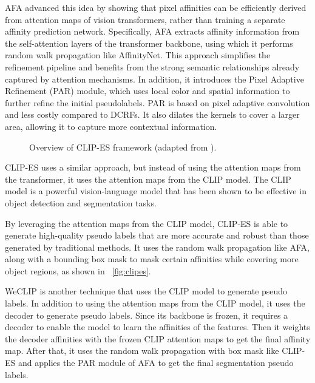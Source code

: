 AFA \cite{wsss_afa_affinity_from_attention} advanced this idea by showing that pixel affinities can be efficiently derived from attention maps of vision transformers, rather than training a separate affinity prediction network. Specifically, AFA extracts affinity information from the self-attention layers of the transformer backbone, using which it performs random walk propagation like AffinityNet. This approach simplifies the refinement pipeline and benefits from the strong semantic relationships already captured by attention mechanisms. In addition, it introduces the Pixel Adaptive Refinement (PAR) module, which uses local color and spatial information to further refine the initial pseudolabels. PAR is based on pixel adaptive convolution and less costly compared to DCRFs. It also dilates the kernels to cover a larger area, allowing it to capture more contextual information.

\begin{figure}[htbp]
    \centering
    \caption{Overview of CLIP-ES framework (adapted from \cite{wsss_clip_es}).}
    \label{fig:clipes}
\end{figure}

CLIP-ES \cite{wsss_clip_es} uses a similar approach, but instead of using the attention maps from the transformer, it uses the attention maps from the CLIP model. The CLIP model is a powerful vision-language model that has been shown to be effective in object detection and segmentation tasks. 

By leveraging the attention maps from the CLIP model, CLIP-ES is able to generate high-quality pseudo labels that are more accurate and robust than those generated by traditional methods. It uses the random walk propagation like AFA, along with a bounding box mask to mask certain affinities while covering more object regions, as shown in ~\autoref{fig:clipes}.

WeCLIP\cite{wsss_frozen_clip} is another technique that uses the CLIP model to generate pseudo labels. In addition to using the attention maps from the CLIP model, it uses the decoder to generate pseudo labels. Since its backbone is frozen, it requires a decoder to enable the model to learn the affinities of the features. Then it weights the decoder affinities with the frozen CLIP attention maps to get the final affinity map. After that, it uses the random walk propagation with box mask like CLIP-ES and applies the PAR module of AFA to get the final segmentation pseudo labels.

